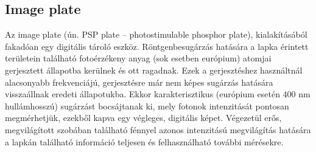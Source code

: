 \begin{multicols}{2}
\subsection{Image plate}
Az image plate (ún. PSP plate -- photostimulable phosphor plate), kialakításából fakadóan egy digitális tároló eszköz. Röntgenbesugárzás hatására a lapka érintett területein található fotoérzékeny anyag (sok esetben európium) atomjai gerjesztett állapotba kerülnek és ott ragadnak. Ezek a gerjesztéshez használtnál alacsonyabb frekvenciájú, gerjesztésre már nem képes sugárzás hatására visszaállnak eredeti állapotukba. Ekkor karakterisztikus (európium esetén $400$ nm hullámhosszú) sugárzást bocsájtanak ki, mely fotonok intenzitását pontosan megmérhetjük, ezekből kapva egy végleges, digitális képet. Végezetül erős, megvilágított szobában található fénnyel azonos intenzitású megvilágítás hatására a lapkán található információ teljesen  és felhasználható további mérésekre.


\end{multicols}
